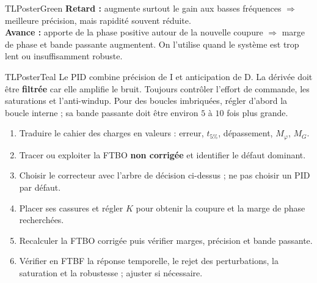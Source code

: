 \documentclass[10pt,a3paper]{article}
\begin{document}
\begin{minipage}[t]{0.49\linewidth}
\begin{TLPosterBloc}{TLPosterGreen}
\textbf{Retard :} augmente surtout le gain aux basses fréquences $\Rightarrow$ meilleure précision, mais rapidité souvent réduite.\\[1mm]
\textbf{Avance :} apporte de la phase positive autour de la nouvelle coupure $\Rightarrow$ marge de phase et bande passante augmentent. On l'utilise quand le système est trop lent ou insuffisamment robuste.
\end{TLPosterBloc}
\begin{TLPosterBloc}{TLPosterTeal}
Le PID combine précision de I et anticipation de D. La dérivée doit être \textbf{filtrée} car elle amplifie le bruit. Toujours contrôler l'effort de commande, les saturations et l'anti-windup. Pour des boucles imbriquées, régler d'abord la boucle interne ; sa bande passante doit être environ $5$ à $10$ fois plus grande.
\end{TLPosterBloc}
\end{minipage}
\vfill
\begin{TLPosterMethode}
\begin{enumerate}
  \item Traduire le cahier des charges en valeurs : erreur, $t_{5\%}$, dépassement, $M_\varphi$, $M_G$.
  \item Tracer ou exploiter la FTBO \textbf{non corrigée} et identifier le défaut dominant.
  \item Choisir le correcteur avec l'arbre de décision ci-dessus ; ne pas choisir un PID par défaut.
  \item Placer ses cassures et régler $K$ pour obtenir la coupure et la marge de phase recherchées.
  \item Recalculer la FTBO corrigée puis vérifier marges, précision et bande passante.
  \item Vérifier en FTBF la réponse temporelle, le rejet des perturbations, la saturation et la robustesse ; ajuster si nécessaire.
\end{enumerate}
\end{TLPosterMethode}
\vfill
{}
\end{document}
